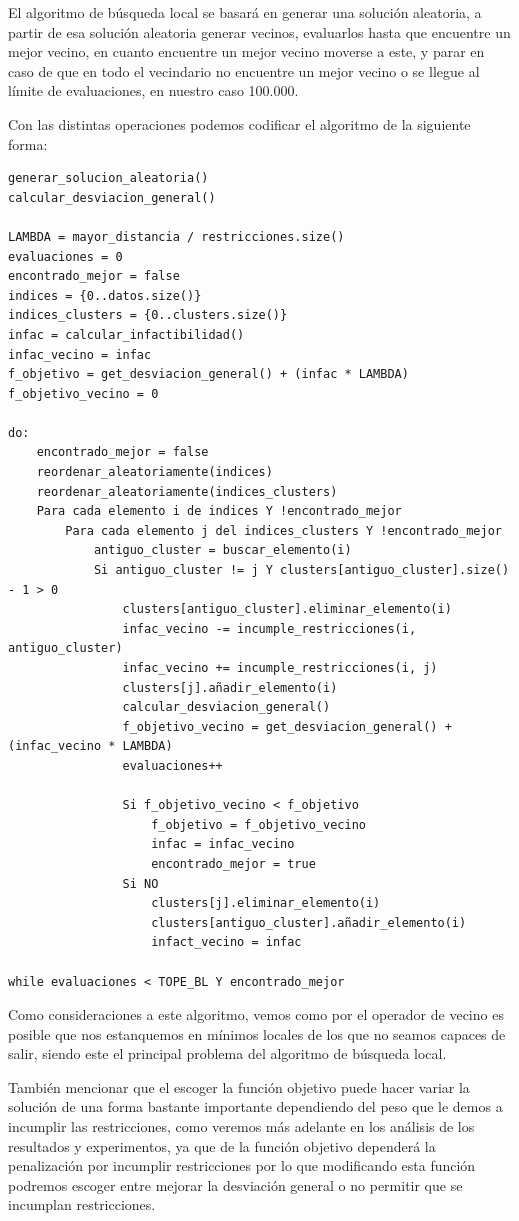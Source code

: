 \documentclass[12pt, spanish]{article}
\begin{document}
El algoritmo de búsqueda local se basará en generar una solución aleatoria, a partir de esa solución aleatoria generar vecinos, evaluarlos hasta que encuentre un mejor vecino, en cuanto encuentre un mejor vecino moverse a este, y parar en caso de que en todo el vecindario no encuentre un mejor vecino o se llegue al límite de evaluaciones, en nuestro caso 100.000.


Con las distintas operaciones podemos codificar el algoritmo de la siguiente forma:

{\small
\begin{lstlisting}
generar_solucion_aleatoria()
calcular_desviacion_general()

LAMBDA = mayor_distancia / restricciones.size()
evaluaciones = 0
encontrado_mejor = false
indices = {0..datos.size()}
indices_clusters = {0..clusters.size()}
infac = calcular_infactibilidad()
infac_vecino = infac
f_objetivo = get_desviacion_general() + (infac * LAMBDA)
f_objetivo_vecino = 0

do:
	encontrado_mejor = false
	reordenar_aleatoriamente(indices)
	reordenar_aleatoriamente(indices_clusters)
	Para cada elemento i de indices Y !encontrado_mejor
		Para cada elemento j del indices_clusters Y !encontrado_mejor
			antiguo_cluster = buscar_elemento(i)
			Si antiguo_cluster != j Y clusters[antiguo_cluster].size() - 1 > 0
				clusters[antiguo_cluster].eliminar_elemento(i)
				infac_vecino -= incumple_restricciones(i, antiguo_cluster)
				infac_vecino += incumple_restricciones(i, j)
				clusters[j].añadir_elemento(i)
				calcular_desviacion_general()
				f_objetivo_vecino = get_desviacion_general() + (infac_vecino * LAMBDA)
				evaluaciones++				
				
				Si f_objetivo_vecino < f_objetivo
					f_objetivo = f_objetivo_vecino
					infac = infac_vecino
					encontrado_mejor = true
				Si NO
					clusters[j].eliminar_elemento(i)
					clusters[antiguo_cluster].añadir_elemento(i)
					infact_vecino = infac

while evaluaciones < TOPE_BL Y encontrado_mejor
 \end{lstlisting}
 }
 
 
Como consideraciones a este algoritmo, vemos como por el operador de vecino es posible que nos estanquemos en mínimos locales de los que no seamos capaces de salir, siendo este el principal problema del algoritmo de búsqueda local.

También mencionar que el escoger la función objetivo puede hacer variar la solución de una forma bastante importante dependiendo del peso que le demos a incumplir las restricciones, como veremos más adelante en los análisis de los resultados y experimentos, ya que de la función objetivo dependerá la penalización por incumplir restricciones por lo que modificando esta función podremos escoger entre mejorar la desviación general o no permitir que se incumplan restricciones.
\end{document}
